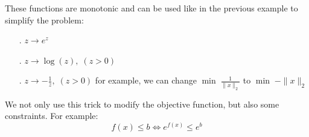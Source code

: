 \begin{example}
\begin{leftbar}
These functions are monotonic and can be used like in the previous example to simplify the problem:
\begin{itemize}
\item[.]{$z \rightarrow e^z$}
\item[.]{$z \rightarrow \log(z), \; (z>0)$}
\item[.]{$z \rightarrow -\frac{1}{z}, \; (z>0)$ for example, we can change $\min \; \frac{1}{\|x\|_{2}}$ to $\min \; -\|x\|_{2}$}\\
\end{itemize}
\end{leftbar}
\end{example}

We not only use this trick to modify the objective function, but also some constraints. For example: 
$$f(x) \leq b \Leftrightarrow e^{f(x)} \leq e^{b}$$
